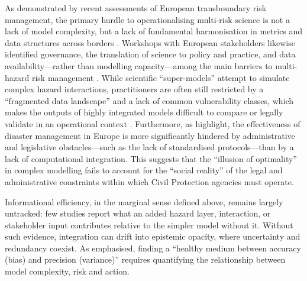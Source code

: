 \documentclass[12pt]{article}
\begin{document}
As demonstrated by recent assessments of European transboundary risk management, the primary hurdle to operationalising multi-risk science is not a lack of model complexity, but a lack of fundamental harmonisation in metrics and data structures across borders \citep{polese2024multi}. Workshops with European stakeholders likewise identified governance, the translation of science to policy and practice, and data availability---rather than modelling capacity---among the main barriers to multi-hazard risk management \citep{sakictrogrlic2024challenges}. While scientific ``super-models'' attempt to simulate complex hazard interactions, practitioners are often still restricted by a ``fragmented data landscape'' and a lack of common vulnerability classes, which makes the outputs of highly integrated models difficult to compare or legally validate in an operational context \citep{polese2024multi}. Furthermore, as \citet{kalogiannidis2024analyzing} highlight, the effectiveness of disaster management in Europe is more significantly hindered by administrative and legislative obstacles—such as the lack of standardised protocols—than by a lack of computational integration. This suggests that the ``illusion of optimality'' in complex modelling fails to account for the ``social reality'' of the legal and administrative constraints within which Civil Protection agencies must operate.

Informational efficiency, in the marginal sense defined above, remains largely untracked: few studies report what an added hazard layer, interaction, or stakeholder input contributes relative to the simpler model without it. Without such evidence, integration can drift into epistemic opacity, where uncertainty and redundancy coexist. As \citet{dunant2021multihazards} emphasised, finding a ``healthy medium between accuracy (bias) and precision (variance)'' requires quantifying the relationship between model complexity, risk and action.
\end{document}
